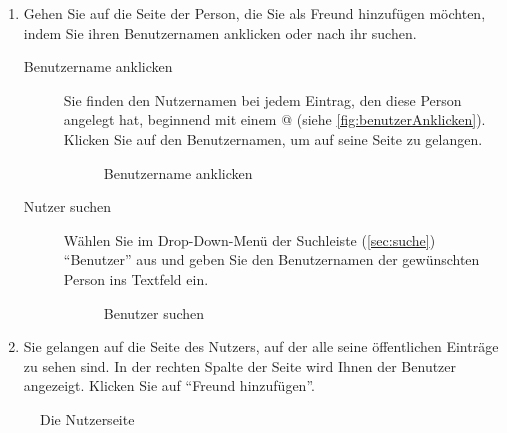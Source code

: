 \begin{enumerate} 
    \item Gehen Sie auf die Seite der Person, die Sie als Freund hinzufügen möchten, indem Sie ihren Benutzernamen anklicken oder nach ihr suchen.
		
		\begin{description}
		\item [Benutzername anklicken] Sie finden den Nutzernamen bei jedem Eintrag, den diese Person angelegt hat, beginnend mit einem @ (siehe \autoref{fig:benutzerAnklicken}). Klicken Sie auf den Benutzernamen, um auf seine Seite zu gelangen.
		
		\begin{figure}[h!]
 \centering
 \caption{Benutzername anklicken}
 \label{fig:benutzerAnklicken}
\end{figure}
		\item [Nutzer suchen] Wählen Sie im Drop-Down-Menü der Suchleiste (\autoref{sec:suche}) \enquote{Benutzer} aus und geben Sie den Benutzernamen der gewünschten Person ins Textfeld ein.
		\begin{figure}[h!]
 \centering
 \caption{Benutzer suchen}
 \label{fig:benutzerSuchen}
\end{figure}

	\end{description}
    \item Sie gelangen auf die Seite des Nutzers, auf der alle seine öffentlichen Einträge zu sehen sind. In der rechten Spalte der Seite wird Ihnen der Benutzer angezeigt. Klicken Sie auf \enquote{Freund hinzufügen}.
\end{enumerate}

\begin{figure}[h!]
 \centering
 \caption{Die Nutzerseite}
 \label{fig:nutzerseite}
\end{figure}

